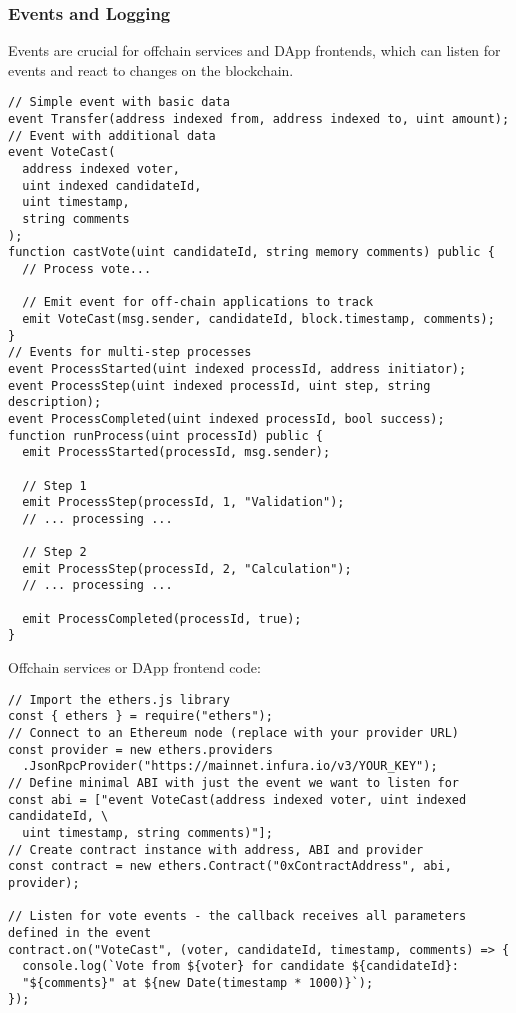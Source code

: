 \documentclass[12pt]{article}
\begin{document}
\subsubsection*{Events and Logging}
Events are crucial for offchain services and DApp frontends, which can listen for events and react to changes on the blockchain.

\noindent
\begin{minipage}[c]{\textwidth}
  \begin{lstlisting}[language=Solidity]
// Simple event with basic data
event Transfer(address indexed from, address indexed to, uint amount);
// Event with additional data
event VoteCast(
  address indexed voter,
  uint indexed candidateId,
  uint timestamp,
  string comments
);
function castVote(uint candidateId, string memory comments) public {
  // Process vote...
  
  // Emit event for off-chain applications to track
  emit VoteCast(msg.sender, candidateId, block.timestamp, comments);
}
// Events for multi-step processes
event ProcessStarted(uint indexed processId, address initiator);
event ProcessStep(uint indexed processId, uint step, string description);
event ProcessCompleted(uint indexed processId, bool success);
function runProcess(uint processId) public {
  emit ProcessStarted(processId, msg.sender);
  
  // Step 1
  emit ProcessStep(processId, 1, "Validation");
  // ... processing ...

  // Step 2
  emit ProcessStep(processId, 2, "Calculation");
  // ... processing ...

  emit ProcessCompleted(processId, true);
}
\end{lstlisting}
\end{minipage}

\medskip
\noindent
Offchain services or DApp frontend code:

\noindent
\begin{minipage}[c]{\textwidth}
  \begin{verbatim}
// Import the ethers.js library
const { ethers } = require("ethers");
// Connect to an Ethereum node (replace with your provider URL)
const provider = new ethers.providers
  .JsonRpcProvider("https://mainnet.infura.io/v3/YOUR_KEY");
// Define minimal ABI with just the event we want to listen for
const abi = ["event VoteCast(address indexed voter, uint indexed candidateId, \
  uint timestamp, string comments)"];
// Create contract instance with address, ABI and provider
const contract = new ethers.Contract("0xContractAddress", abi, provider);

// Listen for vote events - the callback receives all parameters defined in the event
contract.on("VoteCast", (voter, candidateId, timestamp, comments) => {
  console.log(`Vote from ${voter} for candidate ${candidateId}: 
  "${comments}" at ${new Date(timestamp * 1000)}`);
});
  \end{verbatim}
\end{minipage}
\end{document}
